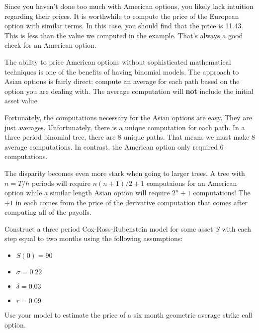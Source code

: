 \documentclass{ximera}
\begin{document}
Since you haven't done too much with American options, you likely lack intuition regarding their prices. It is worthwhile to compute the price of the European option with similar terms. In this case, you should find that the price is 11.43. This is less than the value we computed in the example. That's always a good check for an American option.

The ability to price American options without sophisticated mathematical techniques is one of the benefits of having binomial models. The approach to Asian options is fairly direct: compute an average for each path based on the option you are dealing with. The average computation will {\bf not} include the initial asset value.

Fortunately, the computations necessary for the Asian options are easy. They are just averages. Unfortunately, there is a unique computation for each path. In a three period binomial tree, there are 8 unique paths. That means we must make 8 average computations. In contrast, the American option only required 6 computations.

The disparity becomes even more stark when going to larger trees. A tree with $n=T/h$ periods will require $n(n+1)/2+1$ computaions for an American option while a similar length Asian option will require $2^n+1$ computations! The $+1$ in each comes from the price of the derivative computation that comes after computing all of the payoffs.

\begin{example}

Construct a three period Cox-Ross-Rubenstein model for some asset $S$ with each step equal to two months using the following assumptions:

	\begin{itemize}
	\item $S(0)=90$
	\item $\sigma=0.22$
	\item $\delta=0.03$
	\item $r=0.09$
	\end{itemize}

Use your model to estimate the price of a six month geometric average strike call option.

\end{example}
\end{document}
